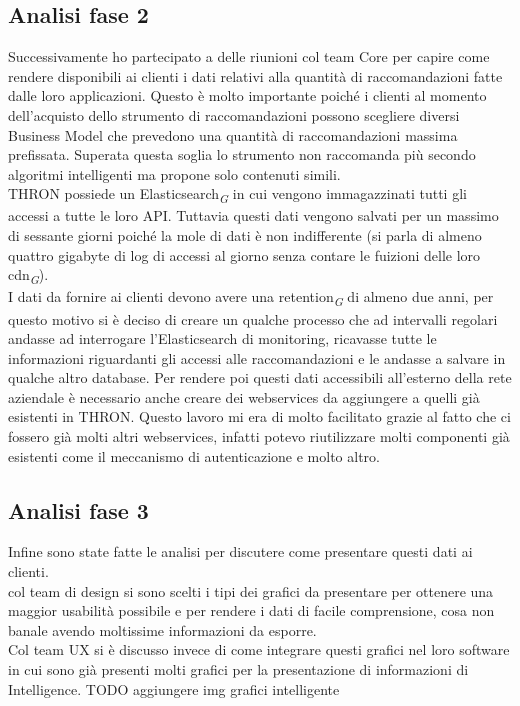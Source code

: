 \documentclass[a4paper, 12pt, twoside, openright]{book}
\newcommand{\gloss}[1]{#1\textsubscript{\textit{\tiny{G}}}}
\begin{document}
\subsection{Analisi fase 2}
Successivamente ho partecipato a delle riunioni col team Core per capire come rendere disponibili ai clienti i dati relativi alla quantità di raccomandazioni fatte dalle loro applicazioni. Questo è molto importante poiché i clienti al momento dell'acquisto dello strumento di raccomandazioni possono scegliere diversi Business Model che prevedono una quantità di raccomandazioni massima prefissata. Superata questa soglia lo strumento non raccomanda più secondo algoritmi intelligenti ma propone solo contenuti simili.\\
THRON possiede un \gloss{Elasticsearch} in cui vengono immagazzinati tutti gli accessi a tutte le loro API. Tuttavia questi dati vengono salvati per un massimo di sessante giorni poiché la mole di dati è non indifferente (si parla di almeno quattro gigabyte di log di accessi al giorno senza contare le fuizioni delle loro \gloss{cdn}).\\I dati da fornire ai clienti devono avere una \gloss{retention} di almeno due anni, per questo motivo si è deciso di creare un qualche processo che ad intervalli regolari andasse ad interrogare l'Elasticsearch di monitoring, ricavasse tutte le informazioni riguardanti gli accessi alle raccomandazioni e le andasse a salvare in qualche altro database. Per rendere poi questi dati accessibili all'esterno della rete aziendale è necessario anche creare dei webservices da aggiungere a quelli già esistenti in THRON. Questo lavoro mi era di molto facilitato grazie al fatto che ci fossero già molti altri webservices, infatti potevo riutilizzare molti componenti già esistenti come il meccanismo di autenticazione e molto altro.

\subsection{Analisi fase 3}
Infine sono state fatte le analisi per discutere come presentare questi dati ai clienti.\\
col team di design si sono scelti i tipi dei grafici da presentare per ottenere una maggior usabilità possibile e per rendere i dati di facile comprensione, cosa non banale avendo moltissime informazioni da esporre.\\
Col team UX si è discusso invece di come integrare questi grafici nel loro software in cui sono già presenti molti grafici per la presentazione di informazioni di Intelligence. TODO aggiungere img grafici intelligente\\
\end{document}
